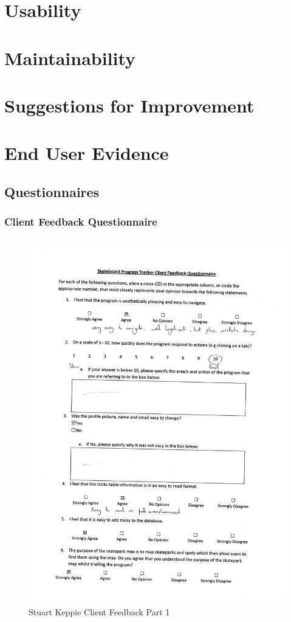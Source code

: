 \section{Usability}

\section{Maintainability}

\section{Suggestions for Improvement}

\section{End User Evidence}

\subsection{Questionnaires}

\subsubsection{Client Feedback Questionnaire} %


\begin{figure}[H]
    \includegraphics[width=\textwidth]{./Evaluation/images/StuFeedback1.pdf}
    \caption{Stuart Keppie Client Feedback Part 1} \label{fig:StuFeedback1}
\end{figure}

